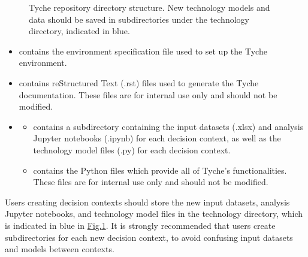 \documentclass[letterpaper,10pt,english]{sphinxmanual}
\let\sphinxpxdimen\pdfpxdimen\else\newdimen\sphinxpxdimen
\begin{document}
\begin{figure}[htbp]
\centering
\capstart

\noindent\sphinxincludegraphics[width=400\sphinxpxdimen]{{image1}.png}
\caption{Tyche repository directory structure. New technology models and data should be saved in sub\sphinxhyphen{}directories under the technology directory, indicated in blue.}\label{\detokenize{cheat-sheet:id1}}\label{\detokenize{cheat-sheet:fig-directorystruct}}\end{figure}
\begin{itemize}
\item {} 
\sphinxAtStartPar
{} contains the environment specification file used to set up the Tyche environment.

\item {} 
\sphinxAtStartPar
{} contains reStructured Text (.rst) files used to generate the Tyche documentation. These files are for internal use only and should not be modified.

\item {} \begin{description}
\begin{itemize}
\item {} 
\sphinxAtStartPar
{} contains a subdirectory containing the input datasets (.xlsx) and analysis Jupyter notebooks (.ipynb) for each decision context, as well as the technology model files (.py) for each decision context.

\item {} 
\sphinxAtStartPar
{} contains the Python files which provide all of Tyche’s functionalities. These files are for internal use only and should not be modified.

\end{itemize}

\end{description}

\end{itemize}

\sphinxAtStartPar
Users creating decision contexts should store the new input datasets, analysis Jupyter notebooks, and technology model files in the technology directory, which is indicated in blue in \hyperref[\detokenize{cheat-sheet:fig-directorystruct}]{Fig.\@ \ref{\detokenize{cheat-sheet:fig-directorystruct}}}. It is strongly recommended that users create sub\sphinxhyphen{}directories for each new decision context, to avoid confusing input datasets and models between contexts.
\end{document}
